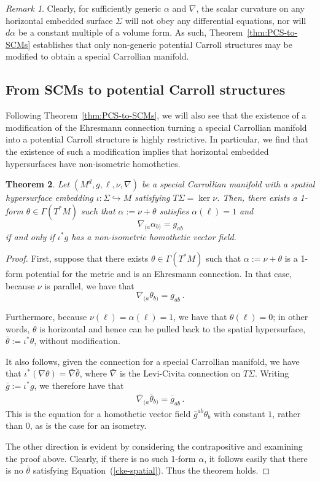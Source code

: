 \documentclass{article}
\newtheorem{theorem}{Theorem}[section]
\theoremstyle{definition}
\theoremstyle{remark}
\newtheorem{remark}[theorem]{Remark}
\begin{document}
\begin{remark}
    Clearly, for sufficiently generic $\alpha$ and $\nabla$, the scalar curvature on any horizontal embedded surface $\Sigma$ will not obey any differential equations, nor will $d \alpha$ be a constant multiple of a volume form. As such, Theorem~\ref{thm:PCS-to-SCMs} establishes that only non-generic potential Carroll structures may be modified to obtain a special Carrollian manifold.
\end{remark}


\subsection{From SCMs to potential Carroll structures}
Following Theorem~\ref{thm:PCS-to-SCMs}, we will also see that the existence of a modification of the Ehresmann connection turning a special Carrollian manifold into a potential Carroll structure is highly restrictive. In particular, we find that the existence of such a modification implies that horizontal embedded hypersurfaces have non-isometric homotheties.
\begin{theorem} \label{conf-killing-constraint}
    Let $(M^d,g,\ell,\nu,\nabla)$ be a special Carrollian manifold with a spatial hypersurface embedding $\iota: \Sigma \hookrightarrow M$ satisfying $T\Sigma = \operatorname{ker}\nu$. Then, there exists a 1-form $\theta \in \Gamma(T^* M)$ such that $\alpha := \nu + \theta$ satisfies $\alpha(\ell) = 1$ and
    $$ \nabla_{(a} \alpha_{b)} = g_{ab}$$
    if and only if $\iota^*g$ has a non-isometric homothetic vector field.
\end{theorem}

\begin{proof}
    First, suppose that there exists $\theta \in \Gamma(T^* M)$ such that $\alpha := \nu + \theta$ is a 1-form potential for the metric and is an Ehresmann connection. In that case, because $\nu$ is parallel, we have that
    $$\nabla_{(a} \theta_{b)} = g_{ab}\,.$$

    Furthermore, because $\nu(\ell) = \alpha(\ell) = 1$, we have that $\theta(\ell) = 0$; in other words, $\theta$ is horizontal and hence can be pulled back to the spatial hypersurface, $\bar{\theta} := \iota^* \theta$, without modification.

    It also follows, given the connection for a special Carrollian manifold, we have that $\iota^*(\nabla \theta) = \bar{\nabla} \bar{\theta}$, where $\bar{\nabla}$ is the Levi-Civita connection on $T\Sigma$. Writing $\bar{g} := \iota^* g$, we therefore have that
    \begin{align} \label{cke-spatial}
    \bar{\nabla}_{(a} \bar{\theta}_{b)} = \bar{g}_{ab}\,.
    \end{align}
    This is the equation for a homothetic vector field $\bar{g}^{ab} \theta_b$ with constant $1$, rather than $0$, as is the case for an isometry.

    The other direction is evident by considering the contrapositive and examining the proof above. Clearly, if there is no such 1-form $\alpha$, it follows easily that there is no $\bar{\theta}$ satisfying Equation~(\ref{cke-spatial}). Thus the theorem holds.   
\end{proof}
\end{document}
